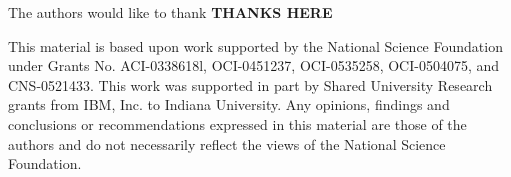 \documentclass[10pt,conference]{IEEEtran}
\begin{document}
The authors would like to thank {\bf THANKS HERE}

This material is based upon work supported by the National Science Foundation under Grants No. ACI-0338618l, OCI-0451237, OCI-0535258, OCI-0504075, and CNS-0521433. This work was supported in part by Shared University Research grants from IBM, Inc. to Indiana University. Any opinions, findings and conclusions or recommendations expressed in this material are those of the authors and do not necessarily reflect the views of the National Science Foundation. 





\end{document}
